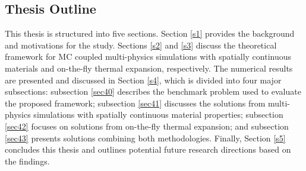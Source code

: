 \subsection{Thesis Outline}

This thesis is structured into five sections. Section \ref{s1} provides the background and motivations for the study. Sections \ref{s2} and \ref{s3} discuss the theoretical framework for MC coupled multi-physics simulations with spatially continuous materials and on-the-fly thermal expansion, respectively. The numerical results are presented and discussed in Section \ref{s4}, which is divided into four major subsections: subsection \ref{sec40} describes the benchmark problem used to evaluate the proposed framework; subsection \ref{sec41} discusses the solutions from multi-physics simulations with spatially continuous material properties; subsection \ref{sec42} focuses on solutions from on-the-fly thermal expansion; and subsection \ref{sec43} presents solutions combining both methodologies. Finally, Section \ref{s5} concludes this thesis and outlines potential future research directions based on the findings.
